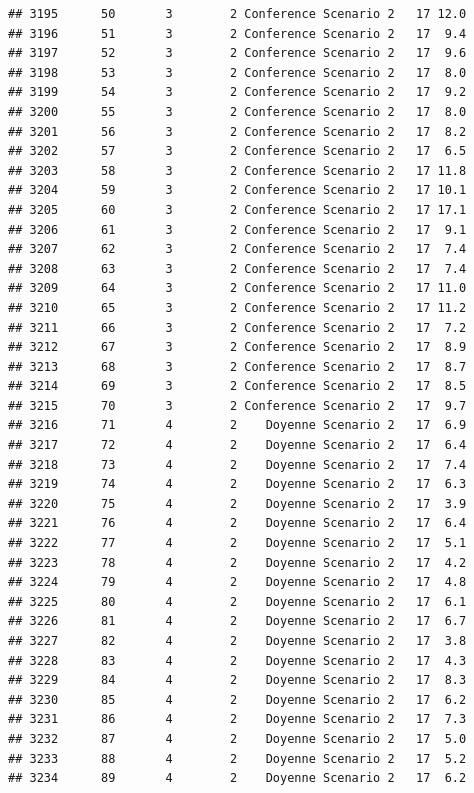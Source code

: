 \documentclass[
]{article}
\begin{document}
\begin{verbatim}
## 3195      50       3        2 Conference Scenario 2   17 12.0
## 3196      51       3        2 Conference Scenario 2   17  9.4
## 3197      52       3        2 Conference Scenario 2   17  9.6
## 3198      53       3        2 Conference Scenario 2   17  8.0
## 3199      54       3        2 Conference Scenario 2   17  9.2
## 3200      55       3        2 Conference Scenario 2   17  8.0
## 3201      56       3        2 Conference Scenario 2   17  8.2
## 3202      57       3        2 Conference Scenario 2   17  6.5
## 3203      58       3        2 Conference Scenario 2   17 11.8
## 3204      59       3        2 Conference Scenario 2   17 10.1
## 3205      60       3        2 Conference Scenario 2   17 17.1
## 3206      61       3        2 Conference Scenario 2   17  9.1
## 3207      62       3        2 Conference Scenario 2   17  7.4
## 3208      63       3        2 Conference Scenario 2   17  7.4
## 3209      64       3        2 Conference Scenario 2   17 11.0
## 3210      65       3        2 Conference Scenario 2   17 11.2
## 3211      66       3        2 Conference Scenario 2   17  7.2
## 3212      67       3        2 Conference Scenario 2   17  8.9
## 3213      68       3        2 Conference Scenario 2   17  8.7
## 3214      69       3        2 Conference Scenario 2   17  8.5
## 3215      70       3        2 Conference Scenario 2   17  9.7
## 3216      71       4        2    Doyenne Scenario 2   17  6.9
## 3217      72       4        2    Doyenne Scenario 2   17  6.4
## 3218      73       4        2    Doyenne Scenario 2   17  7.4
## 3219      74       4        2    Doyenne Scenario 2   17  6.3
## 3220      75       4        2    Doyenne Scenario 2   17  3.9
## 3221      76       4        2    Doyenne Scenario 2   17  6.4
## 3222      77       4        2    Doyenne Scenario 2   17  5.1
## 3223      78       4        2    Doyenne Scenario 2   17  4.2
## 3224      79       4        2    Doyenne Scenario 2   17  4.8
## 3225      80       4        2    Doyenne Scenario 2   17  6.1
## 3226      81       4        2    Doyenne Scenario 2   17  6.7
## 3227      82       4        2    Doyenne Scenario 2   17  3.8
## 3228      83       4        2    Doyenne Scenario 2   17  4.3
## 3229      84       4        2    Doyenne Scenario 2   17  8.3
## 3230      85       4        2    Doyenne Scenario 2   17  6.2
## 3231      86       4        2    Doyenne Scenario 2   17  7.3
## 3232      87       4        2    Doyenne Scenario 2   17  5.0
## 3233      88       4        2    Doyenne Scenario 2   17  5.2
## 3234      89       4        2    Doyenne Scenario 2   17  6.2

\end{verbatim}
\end{document}
